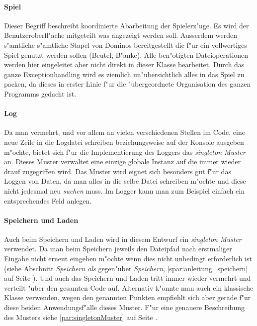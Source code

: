 \paragraph{Spiel}
Dieser Begriff beschreibt koordinierte Abarbeitung der Spielerz"uge. Es wird der Benutzeroberfl"ache mitgeteilt was angezeigt werden soll. Ausserdem werden s"amtliche s"amtliche Stapel von Dominos bereitgestellt die f"ur ein vollwertiges Spiel genutzt werden sollen (Beutel, B"anke). Alle ben"otigten Dateioperationen werden hier eingeleitet aber nicht direkt in dieser Klasse bearbeitet. Durch das ganze Exceptionhandling wird es ziemlich un"ubersichtlich alles in das Spiel zu packen, da dieses in erster Linie f"ur die "ubergeordnete Organisation des ganzen Programms gedacht ist. 

\paragraph{Log}
Da man vermehrt, und vor allem an vielen verschiedenen Stellen im Code, eine neue Zeile in die Logdatei schreiben beziehungsweise auf der Konsole ausgeben m"ochte, bietet sich f"ur die Implementierung des Loggers das \emph{singleton Muster} an. Dieses Muster verwaltet eine einzige globale Instanz auf die immer wieder drauf zugegriffen wird. Das Muster wird eignet sich besonders gut f"ur das Loggen von Daten, da man alles in die selbe Datei schreiben m"ochte und diese nicht jedesmal neu \emph{suchen} muss. Im Logger kann man zum Beispiel einfach ein entsprechendes Feld anlegen. 

\paragraph{Speichern und Laden}
Auch beim Speichern und Laden wird in diesem Entwurf ein \emph{singleton Muster} verwendet. Da man beim Speichern jeweils den Dateipfad nach erstmaliger Eingabe nicht erneut eingeben m"ochte wenn dies nicht unbedingt erforderlich ist (siehe Abschnitt 
\emph{Speichern als} gegen"uber \emph{Speichern}, \ref{spar:anleitung_speichern} auf Seite \pageref{spar:anleitung_speichern}). Und auch das Speichern und Laden tritt immer wieder vermehrt und verteilt "uber den gesamten Code auf. Alternativ k"onnte man auch ein klassische Klasse verwenden, wegen den genannten Punkten empfiehlt sich aber gerade f"ur diese beiden Anwendungsf"alle dieses Muster. F"ur eine genauere Beschreibung des Musters siehe \ref{par:singletonMuster}  auf Seite \pageref{par:singletonMuster}. 
